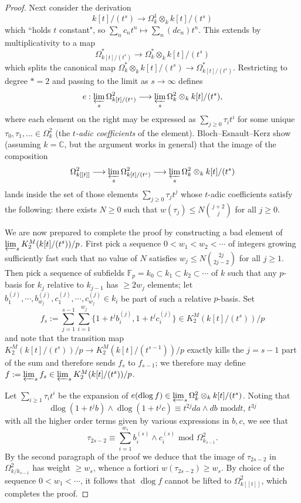 \documentclass{amsart}
\theoremstyle{definition}
\newcommand{\bb}{\mathbb}
\newcommand{\To}{\longrightarrow}
\DeclareMathOperator{\dlog}{dlog}
\begin{document}
\begin{proof}
Next consider the derivation
$$k[t]/(t^s) \rightarrow \Omega^1_k \otimes_k k[t]/(t^s)$$
which ``holds $t$ constant", so $\sum_n c_n t^n \mapsto \sum_n (dc_n)t^n$.  This extends by multiplicativity to a map
$$\Omega^\ast_{k[t]/(t^s)}\rightarrow \Omega^\ast_k \otimes_k k[t]/(t^s)$$
which splits the canonical map $\Omega^\ast_k\otimes_k k[t]/(t^s)\rightarrow
\Omega^\ast_{k[t]/(t^s)}$.   Restricting to degree $\ast=2$ and passing to the
limit as $s\to\infty$ defines \[e:\varprojlim_s\Omega^2_{k[t]/(t^s)}\To
\varprojlim_s\Omega^2_k\otimes_kk[t]/(t^s),\] where each element on the right
may be expressed as $\sum_{j\ge 0}\tau_i t^i$ for some unique
$\tau_0,\tau_1,\dots\in \Omega^2_k$ (the {\em $t$-adic coefficients} of the
element). Bloch--Esnault--Kerz \cite[Lem.~B2]{BlochEsnaultKerz2013} show
(assuming $k = \mathbb{C}$, but the argument works in general) that the image of the composition \[\Omega^2_{k[[t]]}\To \varprojlim_s\Omega^2_{k[t]/(t^s)}\To \varprojlim_s\Omega^2_k\otimes_kk[t]/(t^s)\] lands inside the set of those elements $\sum_{j\ge 0}\tau_j t^j$ whose $t$-adic coefficients satisfy the following: there exists $N\ge0$ such that $w(\tau_j)\le N\binom{j+2}j$ for all $j\ge0$.

We are now prepared to complete the proof by constructing a bad element of $\varprojlim_s K_2^M(k[t]/(t^s))/p$. First pick a sequence $0<w_1<w_2<\cdots$ of integers growing sufficiently fast such that no value of $N$ satisfies $w_j\le N\binom{2j}{2j-2}$ for all $j\ge1$. Then pick a sequence of subfields $\bb F_p=k_0\subset k_1\subset k_2\subset\cdots$ of $k$ such that any $p$-basis for $k_j$ relative to $k_{j-1}$ has $\ge2w_j$ elements; let $b_1^{(j)},\cdots,b_{w_j}^{(j)},c_1^{(j)},\cdots,c_{w_j}^{(j)}\in k_i$ be part of such a relative $p$-basis. Set \[f_s:=\sum_{j=1}^{s-1}\sum_{i=1}^{w_j}\{1+t^jb_i^{(j)},1+t^jc_i^{(j)}\}\in K_2^M(k[t]/(t^{s}))/p\] and note that the transition map $K_2^M(k[t]/(t^{s}))/p\to K_2^M(k[t]/(t^{s-1}))/p$ exactly kills the $j=s-1$ part of the sum and therefore sends $f_s$ to $f_{s-1}$; we therefore may define $f:=\varprojlim_s f_s\in\varprojlim_sK_2^M(k[t]/(t^{s}))/p$.

Let $\sum_{i\ge 1}\tau_it^i$ be the expansion of $e(\dlog
f)\in\varprojlim_s\Omega^2_k\otimes_kk[t]/(t^s)$. Noting that
\[\dlog(1+t^jb)\wedge\dlog(1+t^jc)\equiv t^{2j}da\wedge db\text{ mod
}dt,\,t^{3j}\] with all the higher order terms given by various expressions in
$b,c$, we see that \[\tau_{2s-2}\equiv\sum_{i=1}^{w_{s}}b_i^{(s)}\wedge
c_i^{(s)} \text{ mod }{\Omega^2_{k_{s-1}}}.\] By the second paragraph of the proof we deduce that the image of $\tau_{2s-2}$ in $\Omega^2_{k/k_{s-1}}$ has weight $\ge w_s$, whence a fortiori $w(\tau_{2s-2})\ge w_s$. By choice of the sequence $0< w_1<\cdots$, it follows that $\dlog f$ cannot be lifted to $\Omega^2_{k[[t]]}$, which completes the proof.
\end{proof}
\end{document}
